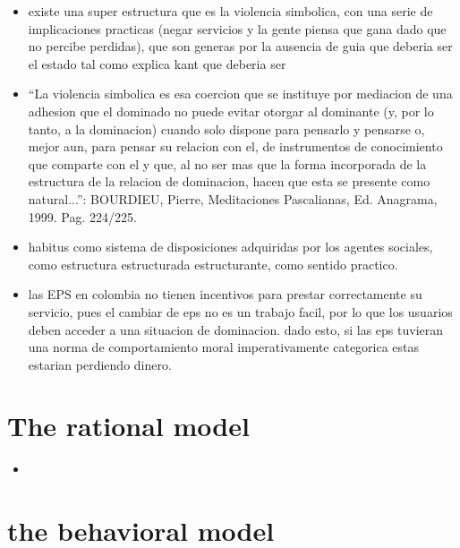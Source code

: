\documentclass[11pt]{article}
\begin{document}
\begin{flushleft}
\begin{snippet}
\begin{itemize}
            \item existe una super estructura que es la violencia simbolica, con una serie de implicaciones practicas (negar servicios y la gente piensa que gana dado que no percibe perdidas), que son generas por la ausencia de guia que deberia ser el estado tal como explica kant que deberia ser
            \item “La violencia simbolica es esa coercion que se instituye por mediacion de una adhesion que el dominado no puede evitar otorgar al dominante (y, por lo tanto, a la dominacion) cuando solo dispone para pensarlo y pensarse o, mejor aun, para pensar su relacion con el, de instrumentos de conocimiento que comparte con el y que, al no ser mas que la forma incorporada de la estructura de la relacion de dominacion, hacen que esta se presente como natural...”: BOURDIEU, Pierre, Meditaciones Pascalianas, Ed. Anagrama, 1999. Pag. 224/225.
            \item habitus como sistema de disposiciones adquiridas por los agentes sociales, como estructura estructurada estructurante, como sentido practico.
            \item las EPS en colombia no tienen incentivos para prestar correctamente su servicio, pues el cambiar de eps no es un trabajo facil, por lo que los usuarios deben acceder a una situacion de dominacion. dado esto, si las eps tuvieran una norma de comportamiento moral imperativamente categorica estas estarian perdiendo dinero.
        \end{itemize}
    \end{snippet}
\end{flushleft}

\section{The rational model}

\begin{flushleft}
    \begin{snippet}
        \begin{itemize}
            \item
        \end{itemize}
    \end{snippet}
\end{flushleft}

\section{the behavioral model}
\end{document}

